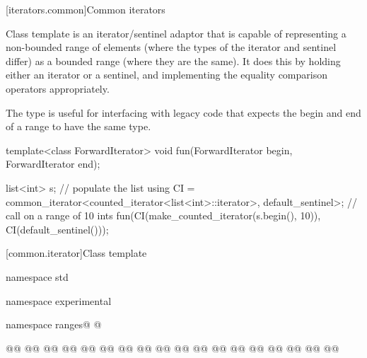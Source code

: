 \begin{addedblock}
[iterators.common]{Common iterators}

\pnum
Class template  is an iterator/sentinel adaptor that is
capable of representing a non-bounded range of elements (where the types of the
iterator and sentinel differ) as a bounded range (where they are the same). It
does this by holding either an iterator or a sentinel, and implementing the
equality comparison operators appropriately.

\pnum
\enternote The  type is useful for interfacing with legacy
code that expects the begin and end of a range to have the same type.\exitnote

\pnum
\enterexample
\begin{codeblock}
template<class ForwardIterator>
void fun(ForwardIterator begin, ForwardIterator end);

list<int> s;
// populate the list 
using CI =
  common_iterator<counted_iterator<list<int>::iterator>,
                  default_sentinel>;
// call  on a range of 10 ints
fun(CI(make_counted_iterator(s.begin(), 10)),
    CI(default_sentinel()));
\end{codeblock}
\exitexample

[common.iterator]{Class template }

%
\begin{codeblock}
namespace std { namespace experimental { namespace ranges@ @ {
  @\oldtxt{// \expos}@
  @@
  @@
    @@
    @@
      @@
      @@
      @@
      @@
    @\oldtxt{\};}@
  @@
  @@
    @@
    @@
  @@
    @@
  @@
    @@

}}}
\end{codeblock}
\end{addedblock}
